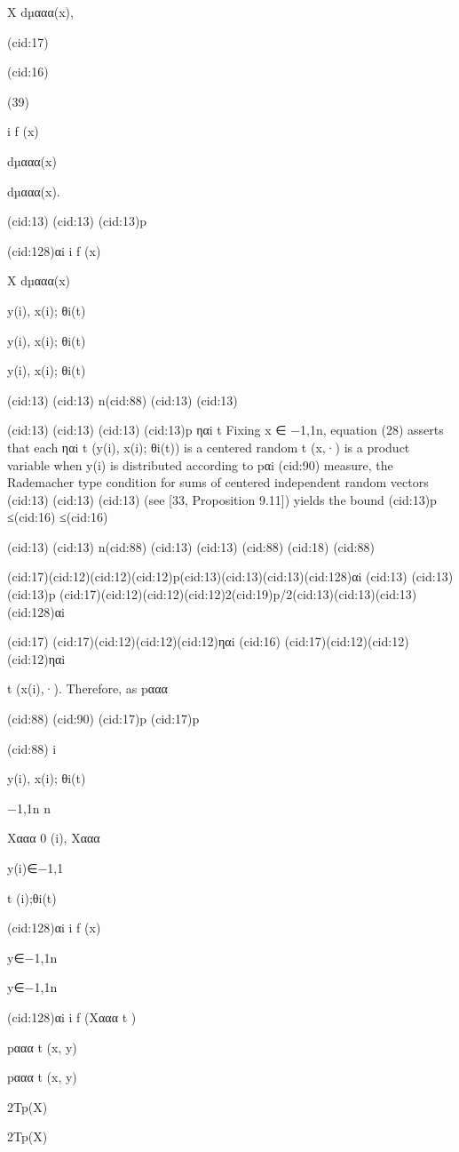{X dµααα(x),

(cid:17)

(cid:16)

(39)

i f (x)

dµααα(x)

dµααα(x).

(cid:13)
(cid:13)
(cid:13)p

(cid:128)αi
i f (x)

X dµααα(x)

y(i), x(i); θi(t)

y(i), x(i); θi(t)

y(i), x(i); θi(t)

(cid:13)
(cid:13) n(cid:88)
(cid:13)
(cid:13)

(cid:13)
(cid:13)
(cid:13)
(cid:13)p
ηαi
t
Fixing x ∈ {−1,1}n, equation (28) asserts that each ηαi
t (y(i), x(i); θi(t)) is a centered random
t (x,·) is a product
variable when y(i) is distributed according to pαi
(cid:90)
measure, the Rademacher type condition for sums of centered independent random vectors
(cid:13)
(cid:13)
(cid:13)
(see [33, Proposition 9.11]) yields the bound
(cid:13)p
≤(cid:16)
≤(cid:16)

(cid:13)
(cid:13) n(cid:88)
(cid:13)
(cid:13)
(cid:88)
(cid:18) (cid:88)

(cid:17)(cid:12)(cid:12)(cid:12)p(cid:13)(cid:13)(cid:13)(cid:128)αi
(cid:13)
(cid:13)
(cid:13)p
(cid:17)(cid:12)(cid:12)(cid:12)2(cid:19)p/2(cid:13)(cid:13)(cid:13)(cid:128)αi

(cid:17)
(cid:17)(cid:12)(cid:12)(cid:12)ηαi
(cid:16)
(cid:17)(cid:12)(cid:12)(cid:12)ηαi

t (x(i),·). Therefore, as pααα

(cid:88)
(cid:90)
(cid:17)p
(cid:17)p

(cid:88) i

y(i), x(i); θi(t)

{−1,1}n
n

Xααα
0 (i), Xααα

y(i)∈{−1,1}

t (i);θi(t)

(cid:128)αi
i f (x)

y∈{−1,1}n

y∈{−1,1}n

(cid:128)αi
i f (Xααα
t )

pααα
t (x, y)

pααα
t (x, y)

2Tp(X)

2Tp(X)

}
